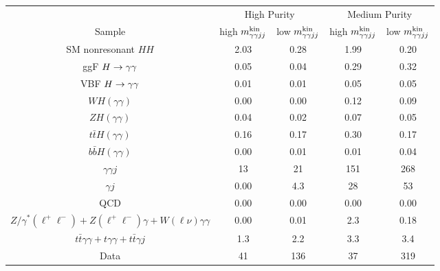 \begin{tabular}{|c|c|c|c|c|}
\hline
 & \multicolumn{2}{c|}{High Purity} & \multicolumn{2}{c|}{Medium Purity} \\
Sample & high $m_{\gamma\gamma jj}^{\rm kin}$ & low $m_{\gamma\gamma jj}^{\rm kin}$ & high $m_{\gamma\gamma jj}^{\rm kin}$ & low $m_{\gamma\gamma jj}^{\rm kin}$ \\
\hline
SM nonresonant $HH$ & 2.03 & 0.28 & 1.99 & 0.20\\
\hline
ggF $H\to\gamma\gamma$                &  0.05 & 0.04 & 0.29 & 0.32\\
VBF $H\to\gamma\gamma$                &  0.01 & 0.01 & 0.05 & 0.05\\
$WH(\gamma\gamma)$        &  0.00 & 0.00 & 0.12 & 0.09\\     
$ZH(\gamma\gamma)$        &  0.04 & 0.02 & 0.07 & 0.05\\
$t\bar{t}H(\gamma\gamma)$ &  0.16 & 0.17 & 0.30 & 0.17\\
$b\bar{b}H(\gamma\gamma)$ &  0.00 & 0.01 & 0.01 & 0.04\\  
\hline
$\gamma\gamma j$     &  13 & 21  & 151 & 268 \\
$\gamma j$           & 0.00& 4.3 & 28  & 53  \\
QCD                  & 0.00& 0.00& 0.00& 0.00\\
$Z/\gamma^*(\ell^+\ell^-) + Z(\ell^+\ell^-)\gamma + W(\ell\nu)\gamma\gamma$
   & 0.00 & 0.01 & 2.3 & 0.18 \\
$t\bar{t}\gamma\gamma + t\gamma\gamma + t\bar{t}\gamma j$ &  1.3 & 2.2 & 3.3 & 3.4 \\
\hline
Data                                  & 41 & 136 & 37 & 319 \\
\hline
\end{tabular}
